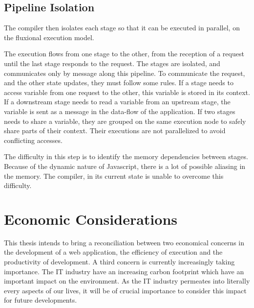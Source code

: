 \subsection{Pipeline Isolation} \label{chapter7:conclusion:isolation}

The compiler then isolates each stage so that it can be executed in parallel, on the fluxional execution model.

The execution flows from one stage to the other, from the reception of a request until the last stage responds to the request.
The stages are isolated, and communicates only by message along this pipeline.
To communicate the request, and the other state updates, they must follow some rules.
If a stage needs to access variable from one request to the other, this variable is stored in its context.
If a downstream stage needs to read a variable from an upstream stage, the variable is sent as a message in the data-flow of the application.
If two stages needs to share a variable, they are grouped on the same execution node to safely share parts of their context.
Their executions are not parallelized to avoid conflicting accesses.

The difficulty in this step is to identify the memory dependencies between stages.
Because of the dynamic nature of Javascript, there is a lot of possible aliasing in the memory.
The compiler, in its current state is unable to overcome this difficulty.



\section{Economic Considerations}

This thesis intends to bring a reconciliation between two economical concerns in the development of a web application, the efficiency of execution and the productivity of development.
A third concern is currently increasingly taking importance.
The IT industry have an increasing carbon footprint which have an important impact on the environment.
As the IT industry permeates into literally every aspects of our lives, it will be of crucial importance to consider this impact for future developments.
